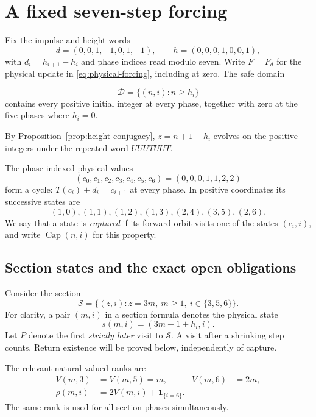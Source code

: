 \section{A fixed seven-step forcing}
\label{sec:seven-step}

Fix the impulse and height words
\[
 d=(0,0,1,-1,0,1,-1),\qquad
 h=(0,0,0,1,0,0,1),
\]
with $d_i=h_{i+1}-h_i$ and phase indices read modulo seven.
Write $F=F_d$ for the physical update in \eqref{eq:physical-forcing}, including at zero.
The safe domain

\[
 \mathcal D=\{(n,i):n\ge h_i\}
\]
contains every positive initial integer at every phase, together with
zero at the five phases where $h_i=0$.

By Proposition~\ref{prop:height-conjugacy}, $z=n+1-h_i$ evolves on
the positive integers under the repeated word $UUUTUUT$.

The phase-indexed physical values
\begin{equation}
 (c_0,c_1,c_2,c_3,c_4,c_5,c_6)=(0,0,0,1,1,2,2)
 \label{eq:seven-cycle}
\end{equation}
form a cycle: $T(c_i)+d_i=c_{i+1}$ at every phase.  In positive
coordinates its successive states are
\[
 (1,0),(1,1),(1,2),(1,3),(2,4),(3,5),(2,6).
\]
We say that a state is \emph{captured} if its forward orbit visits one
of the states $(c_i,i)$, and write $\operatorname{Cap}(n,i)$ for this
property.

\subsection{Section states and the exact open obligations}

Consider the section
\[
 \mathcal S=\{(z,i):z=3m,\ m\ge1,\ i\in\{3,5,6\}\}.
\]
For clarity, a pair $(m,i)$ in a section formula denotes the physical
state
\begin{equation}
 s(m,i)=(3m-1+h_i,i).
 \label{eq:seven-section-launch}
\end{equation}
Let $P$ denote the first \emph{strictly later} visit to $\mathcal S$.
A visit after a shrinking step counts.  Return existence will be proved
below, independently of capture.

The relevant natural-valued ranks are
\begin{align}
 V(m,3)&=V(m,5)=m,& V(m,6)&=2m,\\
 \rho(m,i)&=2V(m,i)+\mathbf1_{\{i=6\}}.
 \label{eq:seven-rho}
\end{align}
The same rank is used for all section phases simultaneously.

